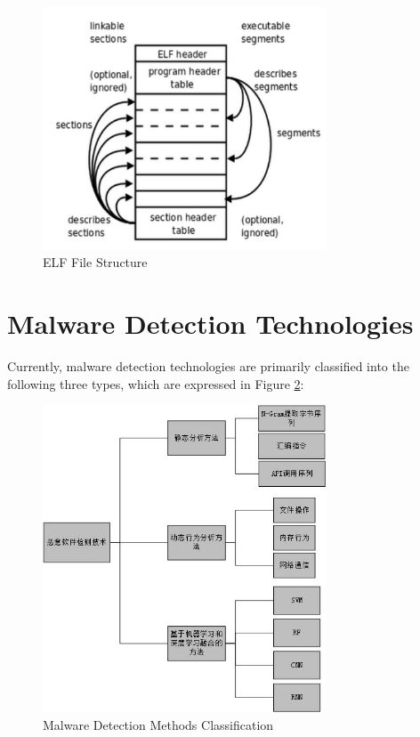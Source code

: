 \begin{figure}[hbt]
	\centering
	\includegraphics[width=0.75\textwidth]{figures/2.1}
	\caption{ELF File Structure}\label{fig:2.1}
\end{figure}

\section{Malware Detection Technologies}

Currently, malware detection technologies are primarily classified into the following three types, which are expressed in Figure \ref{fig:2.2}:

\begin{figure}[hbt]
	\centering
	\includegraphics[width=0.75\textwidth]{figures/2.2}
	\caption{Malware Detection Methods Classification}\label{fig:2.2}
\end{figure}

